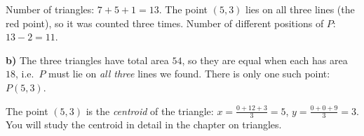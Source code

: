 {
Number of triangles: $7+5+1=13$. The point $(5,3)$ lies on all three lines (the red point), so it was counted three
times. Number of different positions of $P$: $13-2=11$.

\textbf{b)}
The three triangles have total area $54$, so they are equal when each has area $18$, i.e.\ $P$ must lie on
\emph{all three} lines we found. There is only one such point: $P(5,3)$.

\begin{tipbox}The point $(5,3)$ is the \emph{centroid} of the triangle: $x=\tfrac{0+12+3}{3}=5$,
$y=\tfrac{0+0+9}{3}=3$. You will study the centroid in detail in the chapter on triangles.\end{tipbox}
}


